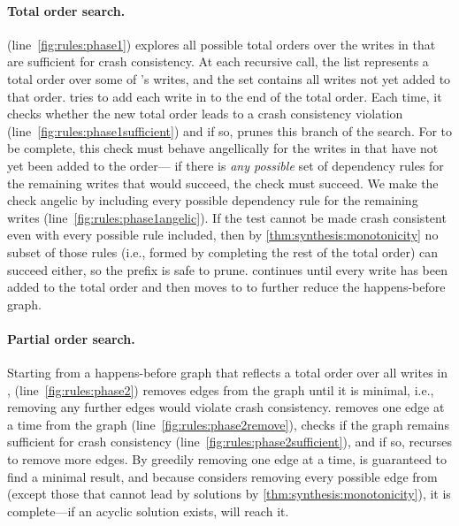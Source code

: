 \paragraph{Total order search.}
\phaseone (line~\ref{fig:rules:phase1})
explores all possible total orders over the writes in \test
that are sufficient for crash consistency.
At each recursive call, the list \ord represents a total order over some of \test's writes,
and the set \wr contains all writes not yet added to that order.
\phaseone tries to add each write in \wr to the end of the total order.
Each time, it checks whether the new total order leads to a crash consistency violation (line~\ref{fig:rules:phase1sufficient})
and if so, prunes this branch of the search.
For \phaseone to be complete, 
this check must behave angellically for the writes in \wr that have not yet been added to the order---%
if there is \emph{any possible} set of dependency rules for the remaining writes that would succeed,
the check must succeed.
We make the check angelic by including every possible dependency rule for the remaining writes (line~\ref{fig:rules:phase1angelic}).
If the test cannot be made crash consistent even with every possible rule included,
then by \cref{thm:synthesis:monotonicity} no subset of those rules
(i.e., formed by completing the rest of the total order)
can succeed either, so the prefix is safe to prune.
\phaseone continues until every write has been added to the total order
and then moves to \phasetwo to further reduce the happens-before graph.\tighten

\paragraph{Partial order search.}
Starting from a happens-before graph \gr that reflects a total order over all writes in \test,
\phasetwo (line~\ref{fig:rules:phase2})
removes edges from the graph until it is minimal,
i.e., removing any further edges would violate crash consistency.
\phasetwo removes one edge at a time from the graph \gr (line~\ref{fig:rules:phase2remove}),
checks if the graph remains sufficient for crash consistency (line~\ref{fig:rules:phase2sufficient}),
and if so, recurses to remove more edges.
By greedily removing one edge at a time,
\phasetwo is guaranteed to find a minimal result,
and because \phasetwo considers removing every possible edge from \gr
(except those that cannot lead by solutions by \cref{thm:synthesis:monotonicity}),
it is complete---if an acyclic solution exists, \phasetwo will reach it.\tighten

